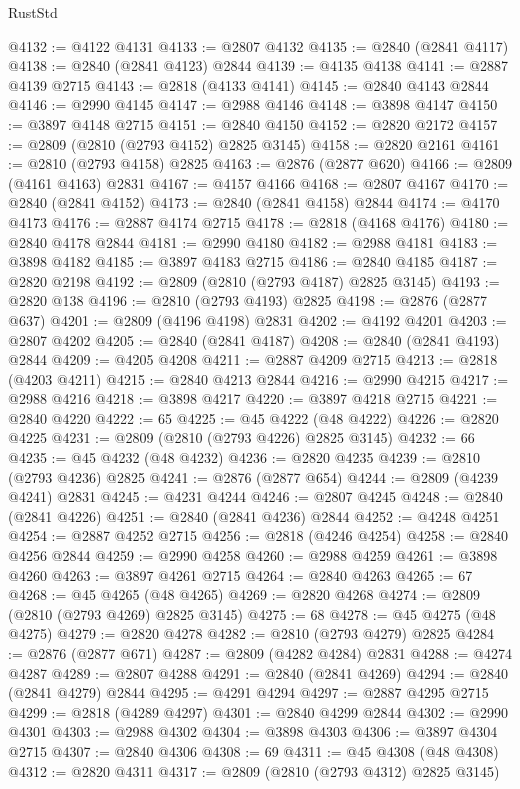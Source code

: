 \begin{lexlean}{RustStd}
\begin{coremodule}
@4132 := @4122 @4131
@4133 := @2807 @4132
@4135 := @2840 (@2841 @4117)
@4138 := @2840 (@2841 @4123) @2844
@4139 := @4135 @4138
@4141 := @2887 @4139 @2715
@4143 := @2818 (@4133 @4141)
@4145 := @2840 @4143 @2844
@4146 := @2990 @4145
@4147 := @2988 @4146
@4148 := @3898 @4147
@4150 := @3897 @4148 @2715
@4151 := @2840 @4150
@4152 := @2820 @2172
@4157 := @2809 (@2810 (@2793 @4152) @2825 @3145)
@4158 := @2820 @2161
@4161 := @2810 (@2793 @4158) @2825
@4163 := @2876 (@2877 @620)
@4166 := @2809 (@4161 @4163) @2831
@4167 := @4157 @4166
@4168 := @2807 @4167
@4170 := @2840 (@2841 @4152)
@4173 := @2840 (@2841 @4158) @2844
@4174 := @4170 @4173
@4176 := @2887 @4174 @2715
@4178 := @2818 (@4168 @4176)
@4180 := @2840 @4178 @2844
@4181 := @2990 @4180
@4182 := @2988 @4181
@4183 := @3898 @4182
@4185 := @3897 @4183 @2715
@4186 := @2840 @4185
@4187 := @2820 @2198
@4192 := @2809 (@2810 (@2793 @4187) @2825 @3145)
@4193 := @2820 @138
@4196 := @2810 (@2793 @4193) @2825
@4198 := @2876 (@2877 @637)
@4201 := @2809 (@4196 @4198) @2831
@4202 := @4192 @4201
@4203 := @2807 @4202
@4205 := @2840 (@2841 @4187)
@4208 := @2840 (@2841 @4193) @2844
@4209 := @4205 @4208
@4211 := @2887 @4209 @2715
@4213 := @2818 (@4203 @4211)
@4215 := @2840 @4213 @2844
@4216 := @2990 @4215
@4217 := @2988 @4216
@4218 := @3898 @4217
@4220 := @3897 @4218 @2715
@4221 := @2840 @4220
@4222 := 65
@4225 := @45 @4222 (@48 @4222)
@4226 := @2820 @4225
@4231 := @2809 (@2810 (@2793 @4226) @2825 @3145)
@4232 := 66
@4235 := @45 @4232 (@48 @4232)
@4236 := @2820 @4235
@4239 := @2810 (@2793 @4236) @2825
@4241 := @2876 (@2877 @654)
@4244 := @2809 (@4239 @4241) @2831
@4245 := @4231 @4244
@4246 := @2807 @4245
@4248 := @2840 (@2841 @4226)
@4251 := @2840 (@2841 @4236) @2844
@4252 := @4248 @4251
@4254 := @2887 @4252 @2715
@4256 := @2818 (@4246 @4254)
@4258 := @2840 @4256 @2844
@4259 := @2990 @4258
@4260 := @2988 @4259
@4261 := @3898 @4260
@4263 := @3897 @4261 @2715
@4264 := @2840 @4263
@4265 := 67
@4268 := @45 @4265 (@48 @4265)
@4269 := @2820 @4268
@4274 := @2809 (@2810 (@2793 @4269) @2825 @3145)
@4275 := 68
@4278 := @45 @4275 (@48 @4275)
@4279 := @2820 @4278
@4282 := @2810 (@2793 @4279) @2825
@4284 := @2876 (@2877 @671)
@4287 := @2809 (@4282 @4284) @2831
@4288 := @4274 @4287
@4289 := @2807 @4288
@4291 := @2840 (@2841 @4269)
@4294 := @2840 (@2841 @4279) @2844
@4295 := @4291 @4294
@4297 := @2887 @4295 @2715
@4299 := @2818 (@4289 @4297)
@4301 := @2840 @4299 @2844
@4302 := @2990 @4301
@4303 := @2988 @4302
@4304 := @3898 @4303
@4306 := @3897 @4304 @2715
@4307 := @2840 @4306
@4308 := 69
@4311 := @45 @4308 (@48 @4308)
@4312 := @2820 @4311
@4317 := @2809 (@2810 (@2793 @4312) @2825 @3145)

\end{coremodule}
\end{lexlean}
